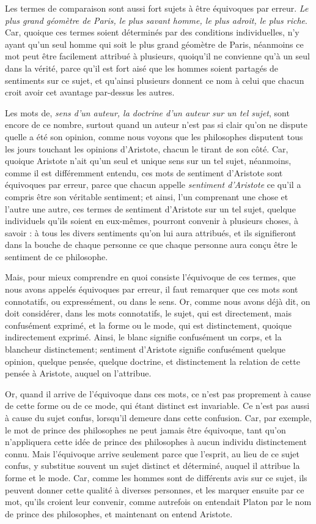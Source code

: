 Les termes de comparaison sont aussi fort sujets à être équivoques par erreur. \emph{Le plus grand géomètre de Paris, le plus savant homme, le plus adroit, le plus riche}. Car, quoique ces termes soient déterminés par des conditions individuelles, n'y ayant qu'un seul homme qui soit le plus grand géomètre de Paris, néanmoins ce mot peut être facilement attribué à plusieurs, quoiqu'il ne convienne qu'à un seul dans la vérité, parce qu'il est fort aisé que les hommes soient partagés de sentiments sur ce sujet, et qu'ainsi plusieurs donnent ce nom à celui que chacun croit avoir cet avantage par-dessus les autres.

Les mots de, \emph{sens d'un auteur, la doctrine d'un auteur sur un tel sujet}, sont encore de ce nombre, surtout quand un auteur n'est pas si clair qu'on ne dispute quelle a été son opinion, comme nous voyons que les philosophes disputent tous les jours touchant les opinions d'Aristote, chacun le tirant de son côté. Car, quoique Aristote n'ait qu'un seul et unique sens sur un tel sujet, néanmoins, comme il est différemment entendu, ces mots de sentiment d'Aristote sont équivoques par erreur, parce que chacun appelle \emph{sentiment d'Aristote} ce qu'il a compris être son véritable sentiment; et ainsi, l'un comprenant une chose et l'autre une autre, ces termes de sentiment d'Aristote sur un tel sujet, quelque individuels qu'ils soient en eux-mêmes, pourront convenir à plusieurs choses, à savoir : à tous les divers sentiments qu'on lui aura attribués, et ils signifieront dans la bouche de chaque personne ce que chaque personne aura conçu être le sentiment de ce philosophe.

Mais, pour mieux comprendre en quoi consiste l'équivoque de ces termes, que nous avons appelés équivoques par erreur, il faut remarquer que ces mots sont connotatifs, ou expressément, ou dans le sens. Or, comme nous avons déjà dit, on doit considérer, dans les mots connotatifs, le sujet, qui est directement, mais confusément exprimé, et la forme ou le mode, qui est distinctement, quoique indirectement exprimé. Ainsi, le blanc signifie confusément un corps, et la blancheur distinctement; sentiment d'Aristote signifie confusément quelque opinion, quelque pensée, quelque doctrine, et distinctement la relation de cette pensée à Aristote, auquel on l'attribue.

Or, quand il arrive de l'équivoque dans ces mots, ce n'est pas proprement à cause de cette forme ou de ce mode, qui étant distinct est invariable. Ce n'est pas aussi à cause du sujet confus, lorsqu'il demeure dans cette confusion. Car, par exemple, le mot de prince des philosophes ne peut jamais être équivoque, tant qu'on n'appliquera cette idée de prince des philosophes à aucun individu distinctement connu. Mais l'équivoque arrive seulement parce que l'esprit, au lieu de ce sujet confus, y substitue souvent un sujet distinct et déterminé, auquel il attribue la forme et le mode. Car, comme les hommes sont de différents avis sur ce sujet, ils peuvent donner cette qualité à diverses personnes, et les marquer ensuite par ce mot, qu'ils croient leur convenir, comme autrefois on entendait Platon par le nom de prince des philosophes, et maintenant on entend Aristote.

